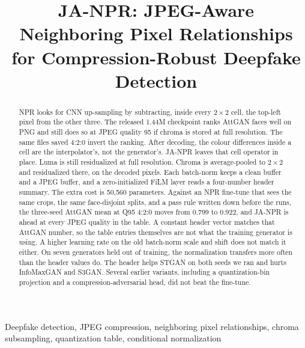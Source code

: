 \documentclass[conference]{IEEEtran}
\begin{document}
\title{JA-NPR: JPEG-Aware Neighboring Pixel Relationships\\for Compression-Robust Deepfake Detection}

\author{
}

\maketitle

\begin{abstract}
NPR looks for CNN up-sampling by subtracting, inside every $2{\times}2$ cell, the top-left pixel from the other three. The released 1.44M checkpoint ranks AttGAN faces well on PNG and still does so at JPEG quality 95 if chroma is stored at full resolution. The same files saved 4:2:0 invert the ranking. After decoding, the colour differences inside a cell are the interpolator's, not the generator's.
JA-NPR leaves that cell operator in place. Luma is still residualized at full resolution. Chroma is average-pooled to $2{\times}2$ and residualized there, on the decoded pixels. Each batch-norm keeps a clean buffer and a JPEG buffer, and a zero-initialized FiLM layer reads a four-number header summary. The extra cost is 50{,}560 parameters. Against an NPR fine-tune that sees the same crops, the same face-disjoint splits, and a pass rule written down before the runs, the three-seed AttGAN mean at Q95 4:2:0 moves from 0.799 to 0.922, and JA-NPR is ahead at every JPEG quality in the table. A constant header vector matches that AttGAN number, so the table entries themselves are not what the training generator is using. A higher learning rate on the old batch-norm scale and shift does not match it either. On seven generators held out of training, the normalization transfers more often than the header values do. The header helps STGAN on both seeds we ran and hurts InfoMaxGAN and S3GAN. Several earlier variants, including a quantization-bin projection and a compression-adversarial head, did not beat the fine-tune.
\end{abstract}

\begin{IEEEkeywords}
Deepfake detection, JPEG compression, neighboring pixel relationships, chroma subsampling, quantization table, conditional normalization
\end{IEEEkeywords}

\end{document}

